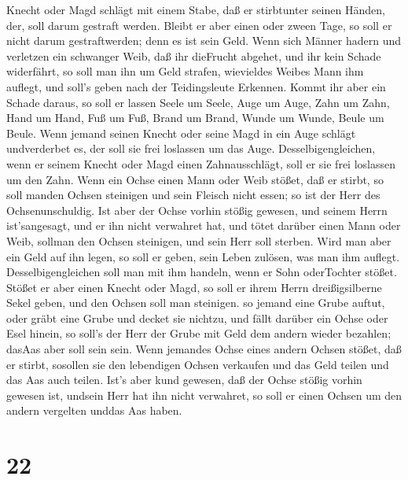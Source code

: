 Knecht oder Magd schlägt mit einem Stabe, daß er stirbtunter seinen
Händen, der, soll darum gestraft werden.  Bleibt er aber
einen oder zween Tage, so soll er nicht darum gestraftwerden; denn es
ist sein Geld.  Wenn sich Männer hadern und verletzen ein
schwanger Weib, daß ihr dieFrucht abgehet, und ihr kein Schade
widerfährt, so soll man ihn um Geld strafen, wievieldes Weibes Mann ihm
auflegt, und soll's geben nach der Teidingsleute Erkennen. 
Kommt ihr aber ein Schade daraus, so soll er lassen Seele um Seele,
 Auge um Auge, Zahn um Zahn, Hand um Hand, Fuß um Fuß,
 Brand um Brand, Wunde um Wunde, Beule um Beule.
 Wenn jemand seinen Knecht oder seine Magd in ein Auge
schlägt undverderbet es, der soll sie frei loslassen um das Auge.
 Desselbigengleichen, wenn er seinem Knecht oder Magd einen
Zahnausschlägt, soll er sie frei loslassen um den Zahn. 
Wenn ein Ochse einen Mann oder Weib stößet, daß er stirbt, so soll
manden Ochsen steinigen und sein Fleisch nicht essen; so ist der Herr
des Ochsenunschuldig.  Ist aber der Ochse vorhin stößig
gewesen, und seinem Herrn ist'sangesagt, und er ihn nicht verwahret hat,
und tötet darüber einen Mann oder Weib, sollman den Ochsen steinigen,
und sein Herr soll sterben.  Wird man aber ein Geld auf ihn
legen, so soll er geben, sein Leben zulösen, was man ihm auflegt.
 Desselbigengleichen soll man mit ihm handeln, wenn er Sohn
oderTochter stößet.  Stößet er aber einen Knecht oder Magd,
so soll er ihrem Herrn dreißigsilberne Sekel geben, und den Ochsen soll
man steinigen.  so jemand eine Grube auftut, oder gräbt
eine Grube und decket sie nichtzu, und fällt darüber ein Ochse oder Esel
hinein,  so soll's der Herr der Grube mit Geld dem andern
wieder bezahlen; dasAas aber soll sein sein.  Wenn jemandes
Ochse eines andern Ochsen stößet, daß er stirbt, sosollen sie den
lebendigen Ochsen verkaufen und das Geld teilen und das Aas auch teilen.
 Ist's aber kund gewesen, daß der Ochse stößig vorhin
gewesen ist, undsein Herr hat ihn nicht verwahret, so soll er einen
Ochsen um den andern vergelten unddas Aas haben.

\hypertarget{section-21}{%
\section{22}\label{section-21}}

